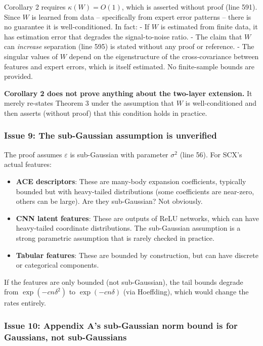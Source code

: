 \documentclass[
  12pt,
]{ctexart}
\providecommand{\tightlist}{%
  \setlength{\itemsep}{0pt}\setlength{\parskip}{0pt}}
\begin{document}
Corollary 2 requires \(\kappa(W) = O(1)\), which is asserted without
proof (line 591). Since \(W\) is learned from data -- specifically from
expert error patterns -- there is no guarantee it is well-conditioned.
In fact: - If \(W\) is estimated from finite data, it has estimation
error that degrades the signal-to-noise ratio. - The claim that \(W\)
can \emph{increase} separation (line 595) is stated without any proof or
reference. - The singular values of \(W\) depend on the eigenstructure
of the cross-covariance between features and expert errors, which is
itself estimated. No finite-sample bounds are provided.

\textbf{Corollary 2 does not prove anything about the two-layer
extension.} It merely re-states Theorem 3 under the assumption that
\(W\) is well-conditioned and then asserts (without proof) that this
condition holds in practice.

\subsubsection{Issue 9: The sub-Gaussian assumption is
unverified}\label{issue-9-the-sub-gaussian-assumption-is-unverified}

The proof assumes \(\varepsilon\) is sub-Gaussian with parameter
\(\sigma^2\) (line 56). For SCX's actual features:

\begin{itemize}
\tightlist
\item
  \textbf{ACE descriptors}: These are many-body expansion coefficients,
  typically bounded but with heavy-tailed distributions (some
  coefficients are near-zero, others can be large). Are they
  sub-Gaussian? Not obviously.
\item
  \textbf{CNN latent features}: These are outputs of ReLU networks,
  which can have heavy-tailed coordinate distributions. The sub-Gaussian
  assumption is a strong parametric assumption that is rarely checked in
  practice.
\item
  \textbf{Tabular features}: These are bounded by construction, but can
  have discrete or categorical components.
\end{itemize}

If the features are only bounded (not sub-Gaussian), the tail bounds
degrade from \(\exp(-c n \delta^2)\) to \(\exp(-c n \delta)\) (via
Hoeffding), which would change the rates entirely.

\subsubsection{Issue 10: Appendix A's sub-Gaussian norm bound is for
Gaussians, not
sub-Gaussians}\label{issue-10-appendix-as-sub-gaussian-norm-bound-is-for-gaussians-not-sub-gaussians}
\end{document}

